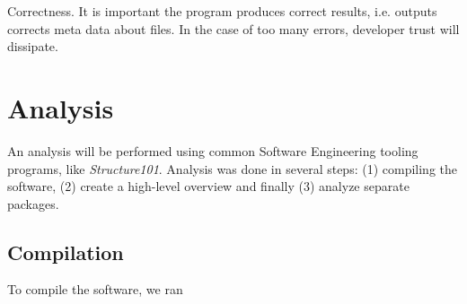 \documentclass{article}
\begin{document}
   \item Correctness. It is important the program produces correct results, i.e. outputs corrects meta data about files. In the case of too many errors, developer trust will dissipate.


\section{Analysis}
An analysis will be performed using common Software Engineering tooling programs, like \textit{Structure101}. Analysis was done in several steps: (1) compiling the software, (2) create a high-level overview and finally (3) analyze separate packages.

\subsection{Compilation}
To compile the software, we ran 
\end{document}
